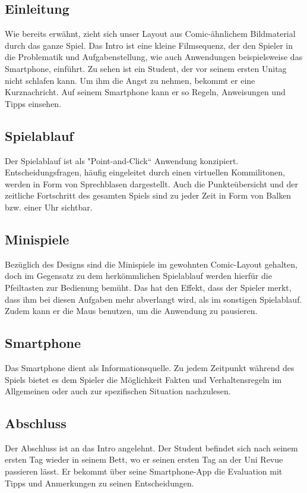 \documentclass[a4paper, 11pt]{article} %
\begin{document}
\subsection{Einleitung}
Wie bereits erwähnt, zieht sich unser Layout aus Comic-ähnlichem Bildmaterial durch das ganze Spiel. Das Intro ist eine kleine Filmsequenz, der den Spieler in die Problematik und Aufgabenstellung, wie auch Anwendungen beispielsweise das Smartphone, einführt. Zu sehen ist ein Student, der vor seinem ersten Unitag nicht schlafen kann. Um ihm die Angst zu nehmen, bekommt er eine Kurznachricht. Auf seinem Smartphone kann er so Regeln, Anweisungen und Tipps einsehen.

\subsection{Spielablauf}
Der Spielablauf ist als "Point-and-Click“ Anwendung konzipiert. Entscheidungsfragen, häufig eingeleitet durch einen virtuellen Kommilitonen, werden in Form von Sprechblasen dargestellt.
Auch die Punkteübersicht und der zeitliche Fortschritt des gesamten Spiels sind zu jeder Zeit in Form von Balken bzw. einer Uhr sichtbar.

\subsection{Minispiele}
Bezüglich des Designs sind die Minispiele im gewohnten Comic-Layout gehalten, doch im Gegensatz zu dem herkömmlichen Spielablauf werden hierfür die Pfeiltasten zur Bedienung bemüht. Das hat den Effekt, dass der Spieler merkt, dass ihm bei diesen Aufgaben mehr abverlangt wird, als im sonstigen Spielablauf. Zudem kann er die Maus benutzen, um die Anwendung zu pausieren.

\subsection{Smartphone}
Das Smartphone dient als Informationsquelle. Zu jedem Zeitpunkt während des Spiels bietet es dem Spieler die Möglichkeit Fakten und Verhaltensregeln im Allgemeinen oder auch zur spezifischen Situation nachzulesen.

\subsection{Abschluss}
Der Abschluss ist an das Intro angelehnt. Der Student befindet sich nach seinem ersten Tag wieder in seinem Bett, wo er seinen ersten Tag an der Uni Revue passieren lässt. Er bekommt über seine Smartphone-App die Evaluation mit Tipps und Anmerkungen zu seinen Entscheidungen. 
\end{document}
